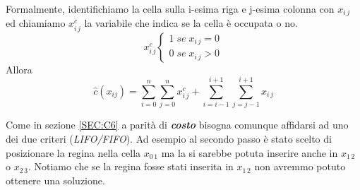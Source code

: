 \documentclass[a4paper]{article}
\newcommand{\imp}[1]{\textbf{\textit{#1}}}
\begin{document}
Formalmente, identifichiamo la cella sulla i-esima riga e j-esima colonna con $x_{i\,j}$ ed chiamiamo $x_{i\,j}^c$ la variabile che indica se la cella è occupata o no.
\begin{equation*}
	x_{i\,j}^c\begin{cases}
		1 \; se \; x_{i\,j} = 0\\
		0 \; se \; x_{i\,j} > 0
	\end{cases}
\end{equation*}
Allora
$$ \hat c(x_{ij})= \sum^n_{i=0} \sum^n_{j=0} x_{i\,j}^c + \sum_{i=i-1}^{i+1} \sum_{j=j-1}^{i+1} x_{i\,j}$$  

Come in sezione \ref{SEC:C6} a parità di \imp{costo} bisogna comunque affidarsi ad uno dei due criteri (\textit{LIFO/FIFO}).
Ad esempio al secondo passo è stato scelto di posizionare la regina nella cella $x_{0 \, 1}$ ma la si sarebbe potuta inserire anche in $x_{1 \, 2}$ o $x_{2 \, 3}$.
Notiamo che se la regina fosse stati inserita in $x_{1 \, 2}$ non avremmo potuto ottenere una soluzione. 
\end{document}
